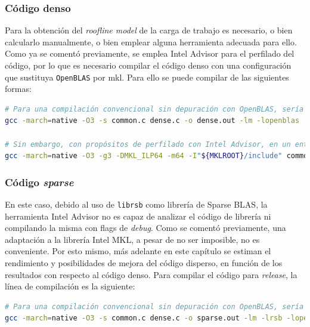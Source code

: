 \subsubsection{Código denso}
Para la obtención del \textit{roofline model} de la carga de trabajo es necesario, o bien calcularlo manualmente, o bien emplear alguna herramienta adecuada para ello. Como ya se comentó previamente, se emplea Intel Advisor para el perfilado del código, por lo que es necesario compilar el código denso con una configuración que sustituya \texttt{OpenBLAS} por \acrshort{mkl}. Para ello se puede compilar de las siguientes formas:\medskip
\begin{lstlisting}[language=bash]
# Para una compilación convencional sin depuración con OpenBLAS, sería necesario únicamente ejecutar
gcc -march=native -O3 -s common.c dense.c -o dense.out -lm -lopenblas

# Sin embargo, con propósitos de perfilado con Intel Advisor, en un entorno bash donde se haya realizado `source /opt/intel/oneapi/setvar.sh` se ha de compilar con:
gcc -march=native -O3 -g3 -DMKL_ILP64 -m64 -I"${MKLROOT}/include" common.c dense.c -o dense.out -L${MKLROOT}/lib/intel64 -Wl,--no-as-needed -lmkl_intel_ilp64 -lmkl_gnu_thread -lmkl_core -lgomp -lpthread -lm -ldl
\end{lstlisting}

\subsubsection{Código \textit{sparse}}
En este caso, debido al uso de \texttt{librsb} como librería de Sparse BLAS, la herramienta Intel Advisor no es capaz de analizar el código de librería ni compilando la misma con flags de \textit{debug}. Como se comentó previamente, una adaptación a la librería Intel MKL, a pesar de no ser imposible, no es conveniente. Por esto mismo, más adelante en este capítulo se estiman el rendimiento y posibilidades de mejora del código disperso, en función de los resultados con respecto al código denso. Para compilar el código para \textit{release}, la línea de compilación es la siguiente:\medskip
\begin{lstlisting}[language=bash]
# Para una compilación convencional sin depuración con OpenBLAS, sería necesario únicamente compilar con:
gcc -march=native -O3 -s common.c dense.c -o sparse.out -lm -lrsb -lopenblas
\end{lstlisting}

